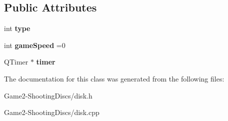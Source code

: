 \subsection*{Public Attributes}
\begin{DoxyCompactItemize}
\item 
\mbox{\label{classDisk_a711085ff24cfa2046f188a2b8c58a858}} 
int {\bfseries type}
\item 
\mbox{\label{classDisk_a8de83d40bc309c5703d7e9a2a10206c3}} 
int {\bfseries game\+Speed} =0
\item 
\mbox{\label{classDisk_a00d5a6ae66eafcda29d9b9b1baa09604}} 
Q\+Timer $\ast$ {\bfseries timer}
\end{DoxyCompactItemize}


The documentation for this class was generated from the following files\+:\begin{DoxyCompactItemize}
\item 
Game2-\/\+Shooting\+Discs/disk.\+h\item 
Game2-\/\+Shooting\+Discs/disk.\+cpp\end{DoxyCompactItemize}

